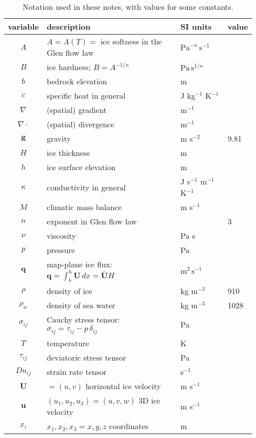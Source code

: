 \documentclass[letterpaper,final,12pt,reqno]{amsart}
\newcommand{\bq}{\mathbf{q}}
\newcommand{\bU}{\mathbf{U}}
\begin{document}
\begin{table}[ht]
\caption{Notation used in these notes, with values for some constants.}
\begin{tabular}{clll}
variable  & description & SI units & value \\
\hline
$A$ & $A=A(T)=$ ice softness in the Glen flow law & $\text{Pa}^{-n}\,\text{s}^{-1}$ \\
$B$ & ice hardness; $B=A^{-1/n}$ & $\text{Pa}\,\text{s}^{1/n}$ \\
$b$ & bedrock elevation & m \\
$c$ & specific heat in general & J kg$^{-1}$ K$^{-1}$ \\
$\nabla$ & (spatial) gradient & m$^{-1}$ \\
$\nabla\cdot$ & (spatial) divergence & m$^{-1}$ \\
$\mathbf{g}$ & gravity & m s$^{-2}$\phantom{foobar} & 9.81 \\
$H$ & ice thickness & m \\
$h$ & ice surface elevation & m \\
$\kappa$ & conductivity in general & J s$^{-1}$ m$^{-1}$ K$^{-1}$ \\
$M$ & climatic mass balance & m s$^{-1}$ \\
$n$ & exponent in Glen flow law & & 3 \\
$\nu$ & viscosity & Pa s \\
$p$ & pressure & Pa \\
$\bq$ & map-plane ice flux: $\bq = \int_{b}^{h} \bU\,dx = \bar{\bU} H$ & $\text{m}^2\,\text{s}^{-1}$ \\
$\rho$ & density of ice & kg m$^{-3}$ & 910 \\
$\rho_w$ & density of sea water & kg m$^{-3}$ & 1028 \\
$\sigma_{ij}$ & Cauchy stress tensor: $\sigma_{ij} = \tau_{ij} - p\, \delta_{ij}$ & Pa \\
$T$ & temperature & K \\
$\tau_{ij}$ & deviatoric stress tensor & Pa \\
$Du_{ij}$ & strain rate tensor & s$^{-1}$ \\
$\mathbf{U}$ & $=(u,v)$ horizontal ice velocity & m s$^{-1}$ \\
$\mathbf{u}$ & $(u_1,u_2,u_3)=(u,v,w)$ 3D ice velocity & m s$^{-1}$ \\
$x_i$ & $x_1,x_2,x_3=x,y,z$ coordinates & m
\end{tabular}
\label{tab:notation}
\end{table}
\end{document}
